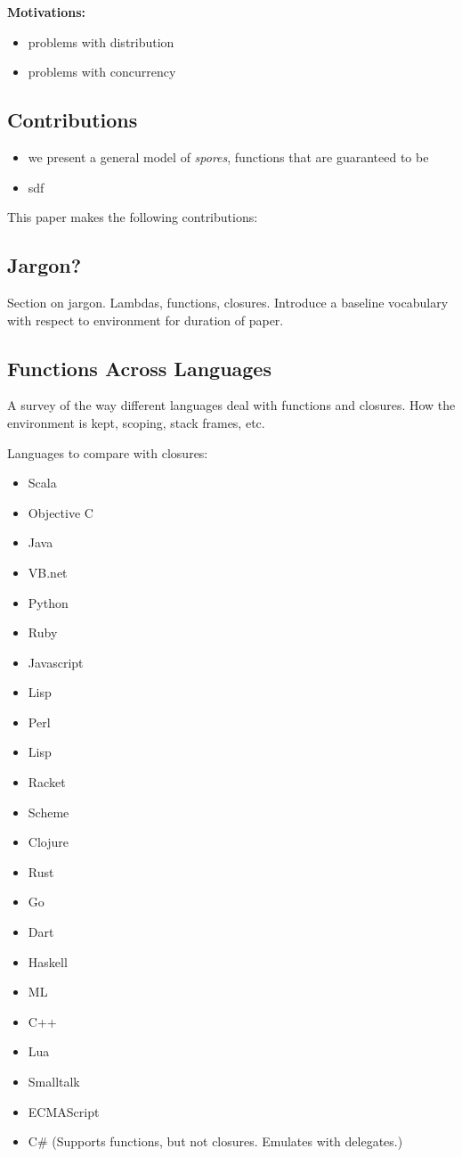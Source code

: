 \documentclass{llncs}
\begin{document}
{\bf Motivations:}
\begin{itemize}
\item problems with distribution
\item problems with concurrency
\end{itemize}

\subsection{Contributions}

\begin{itemize}
\item we present a general model of \textit{spores}, functions that are guaranteed to be 
\item sdf
\end{itemize}


This paper makes the following contributions:

\subsection{Jargon?}

Section on jargon. Lambdas, functions, closures. Introduce a baseline
vocabulary with respect to environment for duration of paper.

\subsection{Functions Across Languages}

A survey of the way different languages deal with functions and closures. How
the environment is kept, scoping, stack frames, etc.

Languages to compare with closures:

\begin{itemize}
\item Scala
\item Objective C
\item Java
\item VB.net
\item Python
\item Ruby
\item Javascript
\item Lisp
\item Perl
\item Lisp
\item Racket
\item Scheme
\item Clojure
\item Rust
\item Go
\item Dart
\item Haskell
\item ML
\item C++
\item Lua
\item Smalltalk
\item ECMAScript
\item C\# (Supports functions, but not closures. Emulates with delegates.)
\end{itemize}
\end{document}
